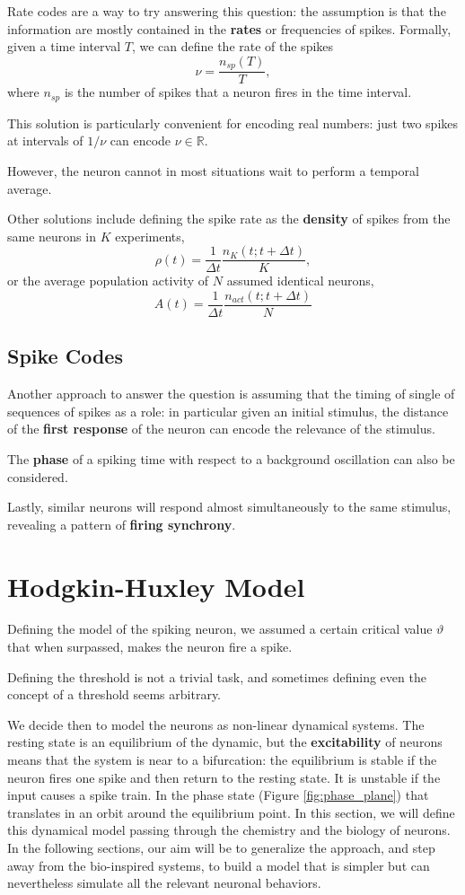 \documentclass[oneside]{book}
\newcommand{\R}{\mathbb{R}}
\theoremstyle{definition}
\theoremstyle{plain}
\begin{document}
Rate codes are a way to try answering this question: the assumption is that the information are mostly contained in the \textbf{rates} or frequencies of spikes.
Formally, given a time interval $T$, we can define the rate of the spikes
\[
    \nu = \frac{n_{sp}(T)}{T},
\]
where $n_{sp}$ is the number of spikes that a neuron fires in the time interval.

This solution is particularly convenient for encoding real numbers: just two spikes at intervals of $1/\nu$ can encode $\nu\in \R$. 

However, the neuron cannot in most situations wait to perform a temporal average.

Other solutions include defining the spike rate as the \textbf{density} of spikes from the same neurons in $K$ experiments,
\[
    \rho(t)= \frac{1}{\Delta t} \frac{n_K(t;t+\Delta t)}{K},
\]
or the average population activity of $N$ assumed identical neurons,
\[
    A(t)= \frac{1}{\Delta t}\frac{n_{act}(t;t+\Delta t)}{N}
\]

\subsection{Spike Codes}
Another approach to answer the question is assuming that the timing of single of sequences of spikes as a role: in particular given an initial stimulus, the distance of the \textbf{first response} of the neuron can encode the relevance of the stimulus. 

The \textbf{phase} of a spiking time with respect to a background oscillation can also be considered.

Lastly, similar neurons will respond almost simultaneously to the same stimulus, revealing a pattern of \textbf{firing synchrony}.

\section{Hodgkin-Huxley Model}
Defining the model of the spiking neuron, we assumed a certain critical value $\vartheta$ that when surpassed, makes the neuron fire a spike.

Defining the threshold is not a trivial task, and sometimes defining even the concept of a threshold seems arbitrary.

We decide then to model the neurons as non-linear dynamical systems. The resting state is an equilibrium of the dynamic, but the \textbf{excitability} of neurons means that the system is near to a bifurcation: the equilibrium is stable if the neuron fires one spike and then return to the resting state. It is unstable if the input causes a spike train. In the phase state (Figure \ref{fig:phase_plane}) that translates in an orbit around the equilibrium point. In this section, we will define this dynamical model passing through the chemistry and the biology of neurons. In the following sections, our aim will be to generalize the approach, and step away from the bio-inspired systems, to build a model that is simpler but can nevertheless simulate all the relevant neuronal behaviors.
\end{document}
